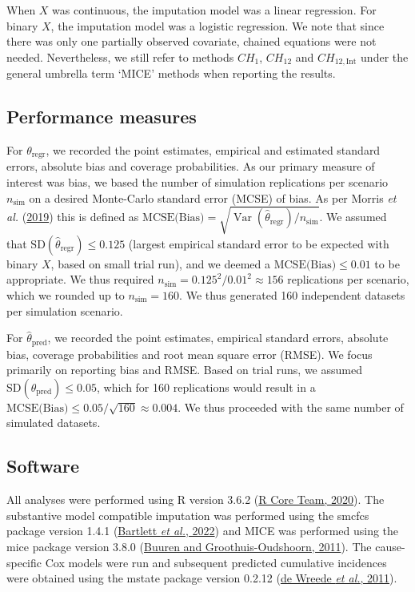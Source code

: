\documentclass[
  letterpaper,
  DIV=11,
  numbers=noendperiod]{scrreprt}
\DeclareMathOperator{\Var}{Var}
\begin{document}
When \(X\) was continuous, the imputation model was a linear regression.
For binary \(X\), the imputation model was a logistic regression. We
note that since there was only one partially observed covariate, chained
equations were not needed. Nevertheless, we still refer to methods
\(CH_{1}\), \(CH_{12}\) and \(CH_{12,\text{Int}}\) under the general
umbrella term `MICE' methods when reporting the results.

\hypertarget{performance-measures}{%
\subsection{Performance measures}\label{performance-measures}}

For \(\theta_{\text{regr}}\), we recorded the point estimates, empirical
and estimated standard errors, absolute bias and coverage probabilities.
As our primary measure of interest was bias, we based the number of
simulation replications per scenario \(n_{\text{sim}}\) on a desired
Monte-Carlo standard error (MCSE) of bias. As per Morris \emph{et al.}
(\protect\hyperlink{ref-morrisUsingSimulationStudies2019}{2019}) this is
defined as
\(\text{MCSE(Bias)} = \sqrt{\Var(\hat{\theta}_{\text{regr}})/n_{\text{sim}}}\).
We assumed that \(\text{SD}(\hat{\theta}_{\text{regr}})\leq 0.125\)
(largest empirical standard error to be expected with binary \(X\),
based on small trial run), and we deemed a
\(\text{MCSE(Bias)} \leq 0.01\) to be appropriate. We thus required
\(n_{\text{sim}} = 0.125^2 / 0.01^2 \approx 156\) replications per
scenario, which we rounded up to \(n_{\text{sim}} = 160\). We thus
generated 160 independent datasets per simulation scenario.

For \(\hat{\theta}_{\text{pred}}\), we recorded the point estimates,
empirical standard errors, absolute bias, coverage probabilities and
root mean square error (RMSE). We focus primarily on reporting bias and
RMSE. Based on trial runs, we assumed
\(\text{SD}(\hat{\theta}_{\text{pred}})\leq 0.05\), which for 160
replications would result in a
\(\text{MCSE(Bias)} \leq 0.05 / \sqrt{160} \approx 0.004\). We thus
proceeded with the same number of simulated datasets.

\hypertarget{software}{%
\subsection{Software}\label{software}}

All analyses were performed using R version 3.6.2
(\protect\hyperlink{ref-rcoreteamLanguageEnvironmentStatistical2020}{R
Core Team, 2020}). The substantive model compatible imputation was
performed using the smcfcs package version 1.4.1
(\protect\hyperlink{ref-bartlettSmcfcsMultipleImputation2022}{Bartlett
\emph{et al.}, 2022}) and MICE was performed using the mice package
version 3.8.0
(\protect\hyperlink{ref-buurenMiceMultivariateImputation2011}{Buuren and
Groothuis-Oudshoorn, 2011}). The cause-specific Cox models were run and
subsequent predicted cumulative incidences were obtained using the
mstate package version 0.2.12
(\protect\hyperlink{ref-dewreedeMstatePackageAnalysis2011}{de Wreede
\emph{et al.}, 2011}).
\end{document}

